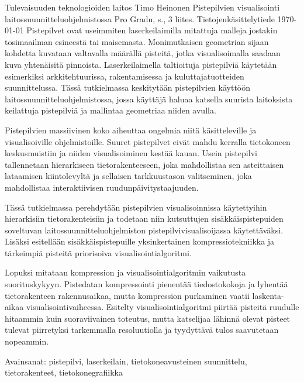 \newpage
\begin{tiivistelma}%
        {Tulevaisuuden teknologioiden laitos}%
        {Timo Heinonen}%
        {Pistepilvien visualisointi laitossuunnitteluohjelmistossa}
        {Pro Gradu, \pageref{LastPage} s., 3 liites.}%
        {Tietojenkäsittelytiede}%
        {\today}%
  Pistepilvet ovat useimmiten laserkeilaimilla mitattuja malleja jostakin tosimaailman esineestä tai maisemasta. Monimutkaisen geometrian sijaan kohdetta kuvataan valtavalla määrällä pisteitä, jotka visualisoimalla saadaan kuva yhtenäisitä pinnoista. Laserkeilaimella taltioituja pistepilviä käytetään esimerkiksi arkkitehtuurissa, rakentamisessa ja kuluttajatuotteiden suunnittelussa. Tässä tutkielmassa keskitytään pistepilvien käyttöön laitossuunnitteluohjelmistossa, jossa käyttäjä haluaa katsella suurista laitoksista keilattuja pistepilviä ja mallintaa geometriaa niiden avulla.

  Pistepilvien massiivinen koko aiheuttaa ongelmia niitä käsitteleville ja visualisoiville ohjelmistoille. Suuret pistepilvet eivät mahdu kerralla tietokoneen keskusmuistiin ja niiden visualisoiminen kestää kauan. Usein pistepilvi tallennetaan hierarkiseen tietorakenteeseen, joka mahdollistaa sen asteittaisen lataamisen kiintolevyltä ja sellaisen tarkkuustason valitseminen, joka mahdollistaa interaktiivisen ruudunpäivitystaajuuden.
  
  Tässä tutkielmassa perehdytään pistepilvien visualisoinnissa käytettyihin hierarkisiin tietorakenteisiin ja todetaan niin kutsuttujen sisäkkäispistepuiden soveltuvan laitossuunnitteluohjelmiston pistepilvivisualisoijassa käytettäväksi. Lisäksi esitellään sisäkkäispistepuille yksinkertainen kompressiotekniikka ja tärkeimpiä pisteitä priorisoiva visualisointialgoritmi. 
  
  Lopuksi mitataan kompression ja visualisointialgoritmin vaikutusta suorituskykyyn. Pistedatan kompressointi pienentää tiedostokokoja ja lyhentää tietorakenteen rakennusaikaa, mutta kompression purkaminen vaatii laskenta-aikaa visualisointivaiheessa. Esitelty visualisointialgoritmi piirtää pisteitä ruudulle hitaammin kuin suoraviivainen toteutus, mutta katselijaa lähinnä olevat pisteet tulevat piirretyksi tarkemmalla resoluutiolla ja tyydyttävä tulos saavutetaan nopeammin.

  Avainsanat: pistepilvi, laserkeilain, tietokoneavusteinen suunnittelu, tietorakenteet, tietokonegrafiikka

\end{tiivistelma}

